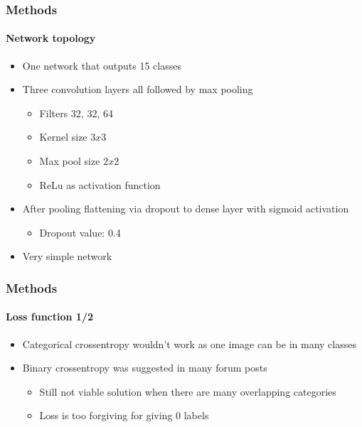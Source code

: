 \begin{frame}
	\frametitle{Methods}
	\framesubtitle{Network topology}
	\begin{itemize}
		\item One network that outputs 15 classes
		\item Three convolution layers all followed by max pooling
		\begin{itemize}
			\item Filters 32, 32, 64
			\item Kernel size $3 x 3$
			\item Max pool size $2 x 2$
			\item ReLu as activation function
		\end{itemize}
		\item After pooling flattening via dropout to dense layer with sigmoid activation
		\begin{itemize}
			\item Dropout value: 0.4
		\end{itemize}
		\item Very simple network
	\end{itemize}
\end{frame}

\begin{frame}
	\frametitle{Methods}
	\framesubtitle{Loss function 1/2}	
	\begin{itemize}
		\item Categorical crossentropy wouldn't work as one image can be in many classes
		\item Binary crossentropy was suggested in many forum posts				
			\begin{itemize}
				\item Still not viable solution when there are many overlapping categories
				\item Loss is too forgiving for giving 0 labels
			\end{itemize}
	\end{itemize}
\end{frame}

